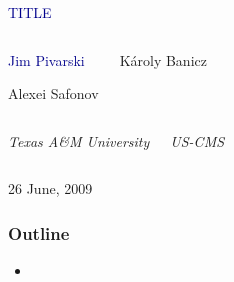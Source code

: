\documentclass[compress]{beamer}
\begin{document}
\begin{frame}
\vfill
\begin{center}
\textcolor{darkblue}{\Large TITLE}

\vfill
\begin{columns}
\begin{center}
\large
\textcolor{darkblue}{Jim Pivarski}

\vspace{0.2 cm}
Alexei Safonov
\end{center}

\begin{center}
\large
K\'aroly Banicz
\end{center}
\end{columns}

\begin{columns}
\begin{center}
\scriptsize
{\it Texas A\&M University}
\end{center}
\begin{center}
\scriptsize
{\it US-CMS}
\end{center}
\end{columns}

\vfill
26 June, 2009

\end{center}
\end{frame}


\small

\begin{frame}
\frametitle{Outline}
\begin{itemize}\setlength{\itemsep}{0.75 cm}
\item 
\end{itemize}
\end{frame}


\begin{frame}
\label{numpages}
\end{frame}
\end{document}
